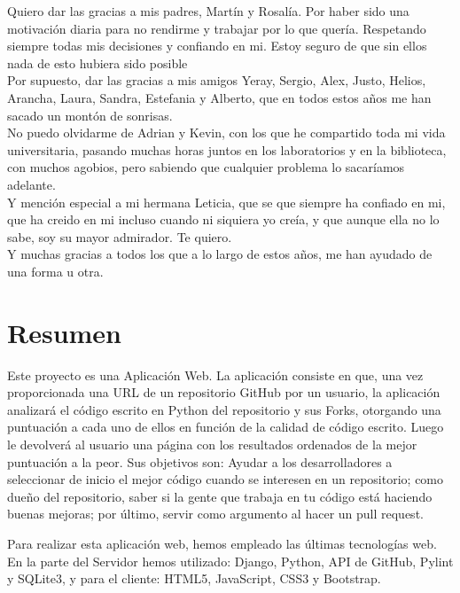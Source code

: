 \documentclass[a4paper, 12pt]{book}
\begin{document}
Quiero dar las gracias a mis padres, Martín y Rosalía. Por haber sido una motivación diaria para no rendirme y trabajar por lo que quería. Respetando siempre todas mis decisiones y confiando en mi. Estoy seguro de que sin ellos nada de esto hubiera sido posible  \\
Por supuesto, dar las gracias a mis amigos Yeray, Sergio, Alex, Justo, Helios, Arancha, Laura, Sandra, Estefania y Alberto, que en todos estos años me han sacado un montón de sonrisas.\\
No puedo olvidarme de Adrian y Kevin, con los que he compartido toda mi vida universitaria, pasando muchas horas juntos en los laboratorios y en la biblioteca, con muchos agobios, pero sabiendo que cualquier problema lo sacaríamos adelante.\\
Y mención especial a mi hermana Leticia, que se que siempre ha confiado en mi, que ha creido en mi incluso cuando ni siquiera yo creía, y que aunque ella no lo sabe, soy su mayor admirador. Te quiero.\\

Y muchas gracias a todos los que a lo largo de estos años, me han ayudado de una forma u otra.


\chapter*{Resumen}

Este proyecto es una Aplicación Web. La aplicación consiste en que, una vez proporcionada una URL de un repositorio GitHub por un usuario, la aplicación analizará el código escrito en Python del repositorio y sus Forks, otorgando una puntuación a cada uno de ellos en función de la calidad de código escrito. Luego le devolverá al usuario una página con los resultados ordenados de la mejor puntuación a la peor. Sus objetivos son: Ayudar a los desarrolladores a seleccionar de inicio el mejor código cuando se interesen en un repositorio; como dueño del repositorio, saber si la gente que trabaja en tu código está haciendo buenas mejoras; por último, servir como argumento al hacer un pull request.

Para realizar esta aplicación web, hemos empleado las últimas tecnologías web. En la parte del Servidor hemos utilizado: Django, Python, API de GitHub, Pylint y SQLite3, y para el cliente: HTML5, JavaScript, CSS3 y Bootstrap.
\end{document}
